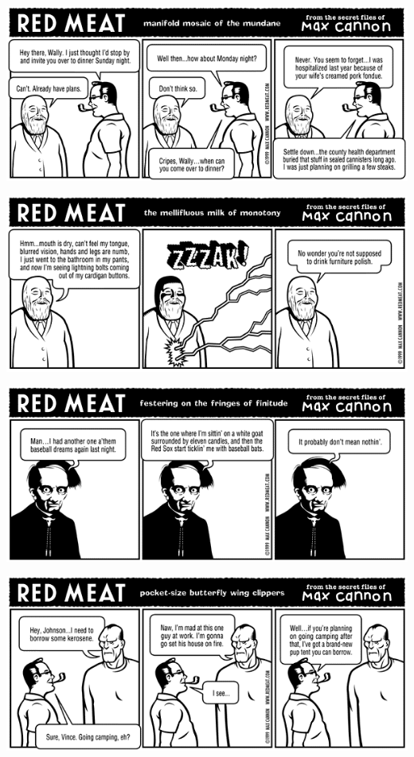 \documentclass[a4paper,twoside,11pt]{article}
\begin{document}
\includegraphics[width=\textwidth]{redmeat_1999-05-10.png}



\includegraphics[width=\textwidth]{redmeat_1999-05-17.png}



\includegraphics[width=\textwidth]{redmeat_1999-05-24.png}



\includegraphics[width=\textwidth]{redmeat_1999-05-31.png}
\end{document}
